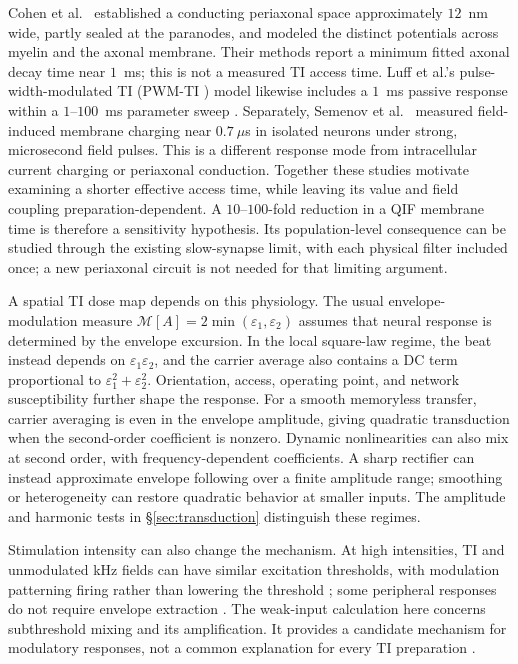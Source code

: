 \documentclass[11pt,a4paper]{article}
\providecommand{\DIFaddtex}[1]{{\protect\color{blue} \sf #1}} %
\providecommand{\DIFaddbegin}{} %
\providecommand{\DIFaddend}{} %
\providecommand{\DIFadd}[1]{\texorpdfstring{\DIFaddtex{#1}}{#1}} %
\begin{document}
Cohen et al.\ \cite{cohen2020periaxonal} established a conducting periaxonal space
approximately $12$~nm wide, partly sealed at the paranodes, and modeled the distinct
potentials across myelin and the axonal membrane. Their methods report a minimum
fitted axonal decay time near $1$~ms; this is not a measured TI access time.
Luff et al.'s \DIFaddbegin \DIFadd{pulse-width-modulated TI (}\DIFaddend PWM-TI\DIFaddbegin \DIFadd{) }\DIFaddend model likewise includes a $1$~ms passive response within a
$1$--$100$~ms parameter sweep \cite{luff2024}. Separately, Semenov et al.\
\cite{semenov2025} measured field-induced membrane charging near $0.7~\mu$s in
isolated neurons under strong, microsecond field pulses. This is a different
response mode from intracellular current charging or periaxonal conduction.
Together these studies motivate examining a shorter effective access time, while
leaving its value and field coupling preparation-dependent. A $10$--$100$-fold
reduction in a QIF membrane time is therefore a sensitivity hypothesis. Its
population-level consequence can be studied through the existing slow-synapse
limit, with each physical filter included once; a new periaxonal circuit is not
needed for that limiting argument.

A spatial TI dose map depends on this physiology. The usual envelope-modulation
measure $\mathcal M[A]=2\min(\varepsilon_1,\varepsilon_2)$ assumes that neural
response is determined by the envelope excursion. In the local square-law regime,
the beat instead depends on $\varepsilon_1\varepsilon_2$, and the carrier average
also contains a DC term proportional to $\varepsilon_1^2+\varepsilon_2^2$.
Orientation, access, operating point, and network susceptibility further shape
the response. For a smooth memoryless transfer, carrier averaging is even in the
envelope amplitude, giving quadratic transduction when the second-order coefficient
is nonzero. Dynamic nonlinearities can also mix at second order, with
frequency-dependent coefficients. A sharp rectifier can instead approximate
envelope following over a finite amplitude range; smoothing or heterogeneity
can restore quadratic behavior at smaller inputs. The amplitude and harmonic
tests in \S\ref{sec:transduction} distinguish these regimes.

Stimulation intensity can also change the mechanism. At high intensities, TI and
unmodulated kHz fields can have similar excitation thresholds, with modulation
patterning firing rather than lowering the threshold
\cite{opancar2025,semenov2025}; some peripheral responses do not require envelope
extraction \cite{peripheral2023}. The weak-input calculation here concerns
subthreshold mixing and its amplification. It provides a candidate mechanism for
modulatory responses, not a common explanation for every TI preparation
\cite{vieira2024,missey2026}.
\end{document}
